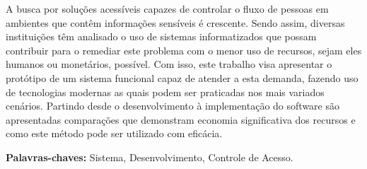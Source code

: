 \begin{resumo}



A busca por soluções acessíveis capazes de controlar o fluxo de pessoas
em ambientes que contêm informações sensíveis é crescente.
Sendo assim, diversas instituições têm analisado o uso de sistemas 
informatizados que possam contribuir para o remediar este problema
com o menor uso de recursos, sejam eles humanos ou monetários, possível.
Com isso, este trabalho visa apresentar o protótipo de um sistema funcional
capaz de atender a esta demanda, fazendo uso de tecnologias modernas as quais
podem ser praticadas nos mais variados cenários.
Partindo desde o desenvolvimento à implementação do software são apresentadas
comparações que demonstram economia significativa dos recursos e como este método
pode ser utilizado com eficácia. 


\textbf{Palavras-chaves: } Sistema, Desenvolvimento, Controle de Acesso.

\end{resumo}
